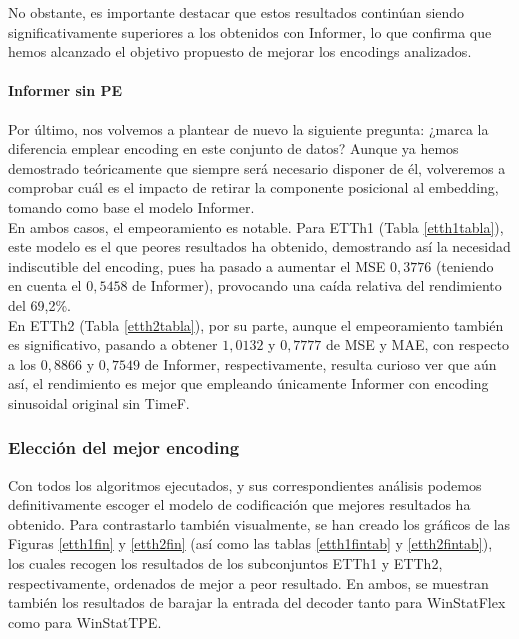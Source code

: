  No obstante, es importante destacar que estos resultados continúan siendo significativamente superiores a los obtenidos con Informer, lo que confirma que hemos alcanzado el objetivo propuesto de mejorar los encodings analizados.
 
 \paragraph{Informer sin PE}
 
Por último, nos volvemos a plantear de nuevo la siguiente pregunta: ¿marca la diferencia emplear encoding en este conjunto de datos? Aunque ya hemos demostrado teóricamente que siempre será necesario disponer de él, volveremos a comprobar cuál es el impacto de retirar la componente posicional al embedding, tomando como base el modelo Informer.\\
 
En ambos casos, el empeoramiento es notable. Para ETTh1 (Tabla \ref{etth1tabla}), este modelo es el que peores resultados ha obtenido, demostrando así la necesidad indiscutible del encoding, pues ha pasado a aumentar el MSE $0,3776$ (teniendo en cuenta el $0,5458$ de Informer), provocando una caída relativa del rendimiento del 69,2\%.\\

En ETTh2 (Tabla \ref{etth2tabla}), por su parte, aunque el empeoramiento también es significativo, pasando a obtener $1,0132$ y $0,7777$ de MSE  y MAE, con respecto a los $0,8866$ y $0,7549$ de Informer, respectivamente, resulta curioso ver que aún así, el rendimiento es mejor que empleando únicamente Informer con encoding sinusoidal original sin TimeF. 

\subsubsection{Elección del mejor encoding}

Con todos los algoritmos ejecutados, y sus correspondientes análisis podemos definitivamente escoger el modelo de codificación que mejores resultados ha obtenido. Para contrastarlo también visualmente, se han creado los gráficos de las Figuras \ref{etth1fin} y \ref{etth2fin} (así como las tablas \ref{etth1fintab} y \ref{etth2fintab}), los cuales recogen los resultados de los subconjuntos ETTh1 y ETTh2, respectivamente, ordenados de mejor a peor resultado. En ambos, se muestran también los resultados de barajar la entrada del decoder tanto para WinStatFlex como para WinStatTPE.\\


